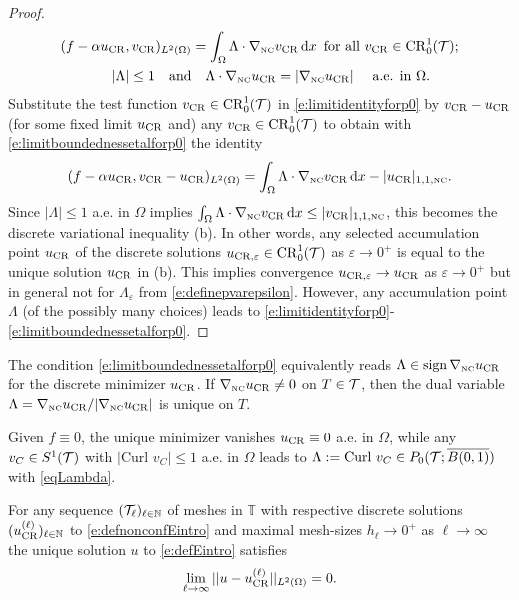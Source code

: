 \begin{proof}
\begin{align}
(f-\alpha u_{\operatorname{CR}}, v_{\operatorname{CR}})_{L^2(\Omega)} &=   \int_\Omega \Lambda \cdot \nabla_{\textup{\tiny NC}} v_{\operatorname{CR}} \,\mathrm dx
\,\text{ for all }v_{\operatorname{CR}}\in {\operatorname{CR}}^1_0(\mathcal{T}) ; \\
\label{e:limitboundednessetalforp0}
|\Lambda|\le 1  \quad \text{and}&\quad
\Lambda\cdot \nabla_{\textup{\tiny NC}}u_{\operatorname{CR}}=| \nabla_{\textup{\tiny NC}}u_{\operatorname{CR}}| \quad\text{  a.e. in }\Omega.
\end{align}
Substitute the test function $v_{\operatorname{CR}}\in {\operatorname{CR}}^1_0(\mathcal{T})$ in  \eqref{e:limitidentityforp0} by  $v_{\operatorname{CR}}-u_{\operatorname{CR}}$ (for some fixed limit $u_{\operatorname{CR}}$
and) any  $v_{\operatorname{CR}}\in {\operatorname{CR}}^1_0(\mathcal{T})$ to obtain with \eqref{e:limitboundednessetalforp0}
the identity 
\[
(f-\alpha u_{\operatorname{CR}}, v_{\operatorname{CR}}-u_{\operatorname{CR}})_{L^2(\Omega)}=  \int_\Omega \Lambda \cdot \nabla_{\textup{\tiny NC}} v_{\operatorname{CR}} \,\mathrm dx - | u_{\operatorname{CR}} |_{1,1,{\textup{\tiny NC}} }.
\]
Since    $|\Lambda|\le 1$  a.e. in $\Omega$ implies
$   \int_\Omega \Lambda \cdot \nabla_{\textup{\tiny NC}} v_{\operatorname{CR}} \,\mathrm dx\le  | v_{\operatorname{CR}} |_{1,1,{\textup{\tiny NC}} }$,
this becomes  the discrete variational inequality
(b). In other words, any selected accumulation point  $u_{\operatorname{CR}}$ of the discrete solutions $u_{\operatorname{CR},\varepsilon} \in {\operatorname{CR}}^1_0(\mathcal{T})$
as $\varepsilon \to 0^+$ is equal to the unique solution $u_{\operatorname{CR}}$  in (b). This implies convergence 
$u_{\operatorname{CR},\varepsilon} \to u_{\operatorname{CR}}$  as $\varepsilon \to 0^+$ but in general not for $\Lambda_\varepsilon$  from
\eqref{e:definepvarepsilon}. However,  any  accumulation point $\Lambda$ (of the possibly many choices) 
 leads to  \eqref{e:limitidentityforp0}-\eqref{e:limitboundednessetalforp0}.
\end{proof}

\begin{remark}
The condition \eqref{e:limitboundednessetalforp0} equivalently reads
$\Lambda\in  \operatorname{sign} \nabla_{\textup{\tiny NC}} u_{\operatorname{CR}}$
for the discrete minimizer $u_{\operatorname{CR}}$. If $\nabla_{\textup{\tiny NC}}u_{\operatorname{CR}} \ne 0$ on $T\in\mathcal{T}$, then the dual 
variable $\Lambda=\nabla_{\textup{\tiny NC}}u_{\operatorname{CR}} /|\nabla_{\textup{\tiny NC}}u_{\operatorname{CR}} |$ is unique on $T$.  
\end{remark}

\begin{example}
Given $f\equiv 0$, the unique minimizer vanishes $u_{\operatorname{CR}}\equiv 0$ a.e. in $\Omega$,
while any 
$v_C\in S^1(\mathcal{T})$ with $|\text{Curl } v_C|\le 1$ a.e. in $\Omega$  leads to
$\Lambda:= \text{Curl } v_C\in P_0(\mathcal{T}; \overline{ B(0,1)})$ with \eqref{eqLambda}.
\end{example}


\begin{theorem}[convergence]
For any sequence $(\mathcal{T}_\ell)_{\ell\in\mathbb{N}}$ of meshes in $\mathbb{T}$ with 
respective discrete solutions $(u_{\operatorname{CR}}^{(\ell)})_{\ell\in\mathbb{N}}$ to
\eqref{e:defnonconfEintro} 
and 
maximal mesh-sizes  $h_\ell \to 0^+$ as $\ell\to \infty$
the unique solution $u$ to \eqref{e:defEintro} satisfies
\[
\lim_{\ell\to\infty} || u- u_{\operatorname{CR}}^{(\ell)}||_{L^2(\Omega)}=0. 
\]

\end{theorem}








